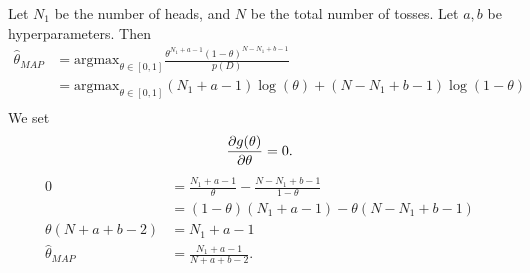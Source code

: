 \documentclass{chaistyle}
\begin{document}
\begin{example*}
    Let \(N_1\) be the number of heads, and \(N\) be the total number of tosses. Let \(a,b\) be hyperparameters. Then \begin{align*}
        \hat\theta_{MAP} &= \text{argmax}_{\theta\in[0,1]}\frac{\theta^{N_1+a-1}(1-\theta)^{N-N_1+b-1}}{p(D)} \\ 
        &= \text{argmax}_{\theta\in[0,1]}(N_1+a-1)\log(\theta)+(N-N_1+b-1)\log(1-\theta) \\ 
    \end{align*}
    We set \[\frac{\partial g(\theta)}{\partial \theta}=0.\]
    \begin{align*}
        0 &= \frac{N_1+a-1}{\theta}-\frac{N-N_1+b-1}{1-\theta} \\
        &= (1-\theta)(N_1+a-1)-\theta(N-N_1+b-1) \\
        \theta(N+a+b-2) &= N_1+a-1 \\ 
        \hat\theta_{MAP} &= \frac{N_1+a-1}{N+a+b-2}.
    \end{align*}
\end{example*}
\end{document}

